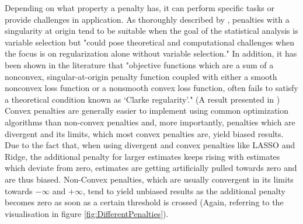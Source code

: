 \documentclass[12pt,a4paper]{article}
\begin{document}
Depending on what property a penalty has, it can perform specific tasks or provide challenges in application. As thoroughly described by \parencite{JohnVettamWu2022}, penalties with a singularity at origin tend to be suitable when the goal of the statistical analysis is variable selection but "could pose theoretical and computational challenges when the focus is on regularization alone without variable selection." In addition, it has been shown in the literature that "objective functions which are a sum of a nonconvex, singular-at-origin penalty function coupled with either a smooth nonconvex loss function or a nonsmooth convex loss function, often fails to satisfy a theoretical condition known as ‘Clarke regularity’." (A result presented in \textcite{QiCuiLiuPang2021}) 
Convex penalties are generally easier to implement using common optimization algorithms than non-convex penalties and, more importantly, penalties which are divergent and its limits, which most convex penalties are, yield biased results. Due to the fact that, when using divergent and convex penalties like LASSO and Ridge, the additional penalty for larger estimates keeps rising with estimates which deviate from zero, estimates are getting artificially pulled towards zero and are thus biased. Non-Convex penalties, which are usually convergent in its limits towards $-\infty$ and $+\infty$, tend to yield unbiased results as the additional penalty becomes zero as soon as a certain threshold is crossed (Again, referring to the visualisation in figure \ref{fig:DifferentPenalties}).    
\end{document}
